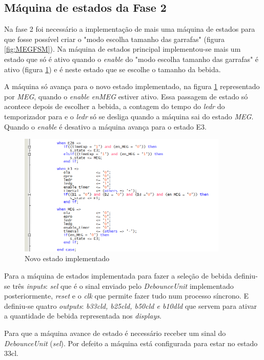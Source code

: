 \documentclass{report}
\begin{document}
\subsection{Máquina de estados da Fase 2}
Na fase 2 foi necessário a implementação de mais uma máquina de estados para que fosse possível criar o "modo escolha tamanho das garrafas" (figura \ref{fig:MEGFSM}). Na máquina de estados principal implementou-se mais um estado que só é ativo quando o \textit{enable} do "modo escolha tamanho das garrafas" é ativo (figura \ref{fig:FSMFase2}) e é neste estado que se escolhe o tamanho da bebida. 

A máquina só avança para o novo estado implementado, na figura \ref{fig:FSMFase2} representado por \textit{MEG}, quando o \textit{enable en\textunderscore MEG} estiver ativo. Essa passagem de estado só acontece depois de escolher a bebida, a contagem do tempo do \textit{ledr} do temporizador para e o \textit{ledr} só se desliga quando a máquina sai do estado \textit{MEG}. Quando o \textit{enable} é desativo a máquina avança para o estado E3.

\begin{figure}[H]
    \centering
    \includegraphics[width = 10cm]{Fase2FSM.png}
    \caption{Novo estado implementado}
    \label{fig:FSMFase2}
\end{figure}

Para a máquina de estados implementada para fazer a seleção de bebida definiu-se três \textit{inputs}: \textit{sel} que é o sinal enviado pelo \textit{DebounceUnit} implementado posteriormente, \textit{reset} e o \textit{clk} que permite fazer tudo num processo síncrono. E definiu-se quatro \textit{outputs}: \textit{b33cl\textunderscore d, b25cl\textunderscore d, b50cl\textunderscore d e b10dl\textunderscore d} que servem para ativar a quantidade de bebida representada nos \textit{displays}.

Para que a máquina avance de estado é necessário receber um sinal do \textit{DebounceUnit} (\textit{sel}). Por defeito a máquina está configurada para estar no estado 33cl.
\end{document}
